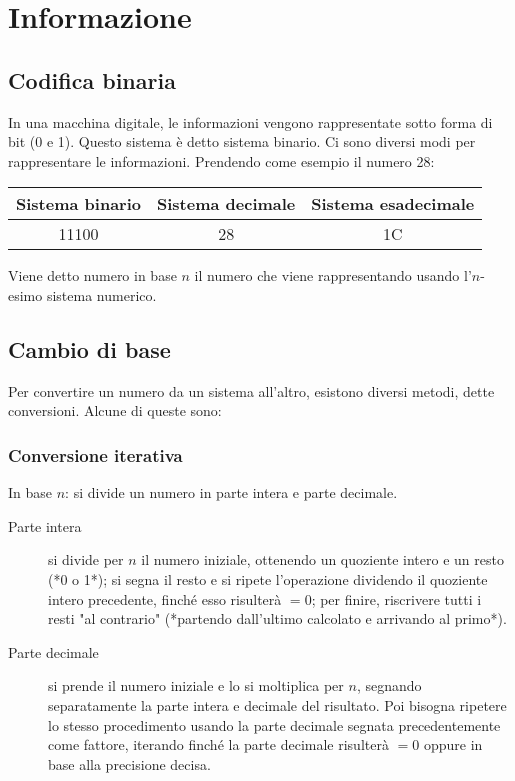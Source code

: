 \documentclass{article}
\begin{document}
\section{Informazione}

\subsection{Codifica binaria}

In una macchina digitale, le informazioni vengono rappresentate sotto forma di bit (0 e 1).
Questo sistema è detto sistema binario.
Ci sono diversi modi per rappresentare le informazioni. Prendendo come esempio il numero 28:

\begin{center}
\begin{tabular}{ |c|c|c| }
\hline
Sistema binario & Sistema decimale & Sistema esadecimale \\
\hline
\hline
11100 & 28 & 1C \\
\hline
\end{tabular}
\end{center}

\noindent
Viene detto numero in base $n$ il numero che viene rappresentando usando l'$n$-esimo sistema numerico.

\subsection{Cambio di base}

Per convertire un numero da un sistema all'altro, esistono diversi metodi, dette conversioni. Alcune di queste sono:

\subsubsection{Conversione iterativa}

In base $n$: si divide un numero in parte intera e parte decimale.

\begin{description}
    \item[Parte intera] si divide per $n$ il numero iniziale, ottenendo un quoziente intero e un resto (*0 o 1*); si segna il resto e si ripete l'operazione dividendo il quoziente intero precedente, finché esso risulterà $= 0$; per finire, riscrivere tutti i resti "al contrario" (*partendo dall'ultimo calcolato e arrivando al primo*).
    \item[Parte decimale] si prende il numero iniziale e lo si moltiplica per $n$, segnando separatamente la parte intera e decimale del risultato. Poi bisogna ripetere lo stesso procedimento usando la parte decimale segnata precedentemente come fattore, iterando finché la parte decimale risulterà $= 0$ oppure in base alla precisione decisa.
\end{description}
\end{document}
